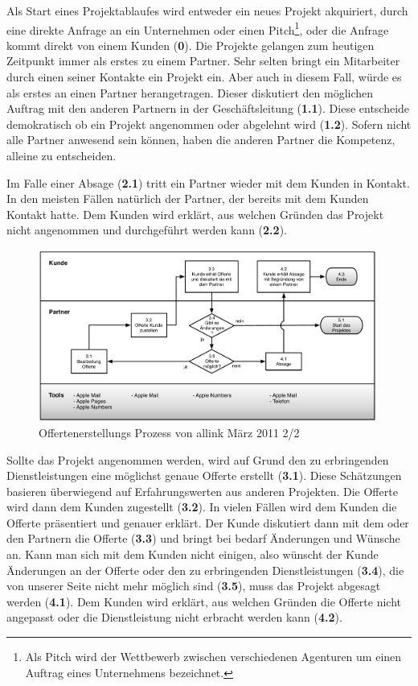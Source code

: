 Als Start eines Projektablaufes wird entweder ein neues Projekt akquiriert, 
durch eine direkte Anfrage an ein Unternehmen oder einen Pitch\footnote{Als Pitch 
wird der Wettbewerb zwischen verschiedenen Agenturen um einen Auftrag eines 
Unternehmens bezeichnet.}, oder die Anfrage kommt direkt von einem Kunden (\textbf{0}). 
Die Projekte gelangen zum heutigen Zeitpunkt immer als erstes zu einem Partner. 
Sehr selten bringt ein Mitarbeiter durch einen seiner Kontakte ein Projekt ein. 
Aber auch in diesem Fall, würde es als erstes an einen Partner herangetragen.
Dieser diskutiert den möglichen Auftrag mit den anderen Partnern in der 
Geschäftsleitung (\textbf{1.1}). Diese entscheide demokratisch ob ein Projekt 
angenommen oder abgelehnt wird (\textbf{1.2}). Sofern nicht alle Partner anwesend 
sein können, haben die anderen Partner die Kompetenz, alleine zu entscheiden.

Im Falle einer Absage (\textbf{2.1}) tritt ein Partner wieder mit dem Kunden in Kontakt.
In den meisten Fällen natürlich der Partner, der bereits mit dem Kunden Kontakt
hatte. Dem Kunden wird erklärt, aus welchen Gründen das Projekt nicht angenommen
und durchgeführt werden kann (\textbf{2.2}).

\begin{figure}[htbp]
\begin{center}
\includegraphics[width=0.99\textwidth,angle=0]{./bilder/analyse/01_ist_prozesse_offerte_02.pdf}
\caption{Offertenerstellungs Prozess von allink März 2011 2/2}
\label{pic:01_ist_prozesse_offerte_02}
\end{center}
\end{figure}

Sollte das Projekt angenommen werden, wird auf Grund den zu erbringenden
Dienstleistungen eine möglichst genaue Offerte erstellt (\textbf{3.1}). Diese Schätzungen
basieren überwiegend auf Erfahrungswerten aus anderen Projekten.
Die Offerte wird dann dem Kunden zugestellt (\textbf{3.2}). In vielen Fällen wird dem Kunden
die Offerte präsentiert und genauer erklärt.
Der Kunde diskutiert dann mit dem oder den Partnern die Offerte (\textbf{3.3}) und bringt
bei bedarf Änderungen und Wünsche an.
Kann man sich mit dem Kunden nicht einigen, also wünscht der Kunde Änderungen
an der Offerte oder den zu erbringenden Dienstleistungen (\textbf{3.4}), die von unserer Seite
nicht mehr möglich sind (\textbf{3.5}), muss das Projekt abgesagt werden (\textbf{4.1}).
Dem Kunden wird erklärt, aus welchen Gründen die Offerte nicht angepasst oder
die Dienstleistung nicht erbracht werden kann (\textbf{4.2}).

